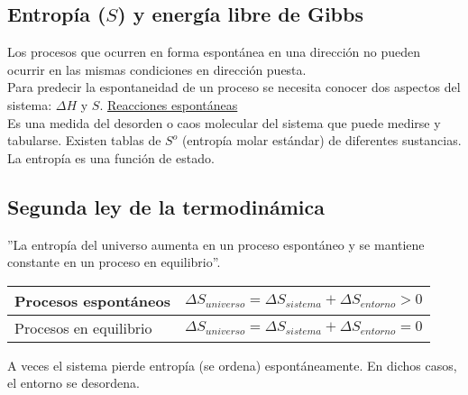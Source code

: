     \subsection{Entropía ($S$) y energía libre de Gibbs}
        \sangria{} Los procesos que ocurren en forma espontánea en una dirección no pueden ocurrir en las mismas condiciones en dirección puesta. \\
        Para predecir la espontaneidad de un proceso se necesita conocer dos aspectos del sistema: $\Delta H$ y $S$.
         \vspace{-15pt}
        \underline{Reacciones espontáneas} \\
        \sangria{} Es una medida del desorden o caos molecular del sistema que puede medirse y tabularse.
        \sangria{} Existen tablas de $S^o$ (entropía molar estándar) de diferentes sustancias. \\
        \sangria{} La entropía es una función de estado.

    \subsection{Segunda ley de la termodinámica}
        \sangria{} ''La entropía del universo aumenta en un proceso espontáneo y se mantiene constante en un proceso en equilibrio''.
        \begin{center} 
            \begin{tabular}{| m{3.1cm} | m{4.5cm} |}
                \hline
                Procesos espontáneos & $\Delta S_{universo} = \Delta S_{sistema} + \Delta S_{entorno} > 0$ \\
                \hline
                Procesos en equilibrio & $\Delta S_{universo} = \Delta S_{sistema} + \Delta S_{entorno} = 0$ \\
                \hline
            \end{tabular}
        \end{center}
        \sangria{} A veces el sistema pierde entropía (se ordena) espontáneamente. En dichos casos, el entorno se desordena.
